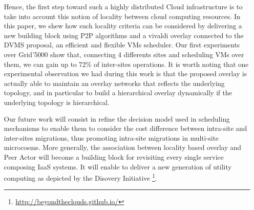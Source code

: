 Hence, the first step toward such a highly distributed Cloud infrastructure is
to take into account this notion of locality between cloud computing resources.
In this paper, we shew how such locality criteria can be considered by
delivering a new building block using  P2P algorithms and a vivaldi overlay
connected to the DVMS proposal, an efficient and flexible VMs scheduler.  Our
first experiments over Grid'5000 show that, connecting 4 differents sites and
scheduling VMs over them, we can gain up to 72\% of inter-sites operations. It
is worth noting that one experimental observation we had during this work is
that the proposed overlay is actually able to maintain an overlay networks that
reflects the underlying topology, and in particular to build a hierarchical
overlay dynamically if the underlying topology is hierarchical.

Our future work will consist in refine the decision model used in scheduling mechanisms to enable them to consider the cost difference between intra-site and inter-sites migrations, thus promoting intra-site migrations in multi-site microcosms. More generally, the association between locality based overlay and Peer Actor will become a building block for revisiting every single service composing IaaS systems. It will enable to deliver a new generation of utility computing as depicted by the
Disovery Initiative \footnote{\url{http://beyondtheclouds.github.io/}}.
